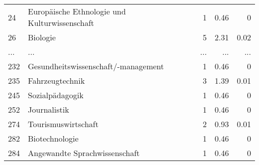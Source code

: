 \begin{longtable}{lXrrr}
        24 & \multicolumn{1}{X}{Europäische Ethnologie und Kulturwissenschaft} & %
          \num{1} &
          \num[round-mode=places,round-precision=2]{0.46} &
          \num[round-mode=places,round-precision=2]{0} \\
        26 & \multicolumn{1}{X}{Biologie} & %
          \num{5} &
          \num[round-mode=places,round-precision=2]{2.31} &
          \num[round-mode=places,round-precision=2]{0.02} \\
       ... & ... & ... & ... & ... \\
        232 & \multicolumn{1}{X}{Gesundheitswissenschaft/-management} & %
          \num{1} &
          \num[round-mode=places,round-precision=2]{0.46} &
          \num[round-mode=places,round-precision=2]{0} \\

        235 & \multicolumn{1}{X}{Fahrzeugtechnik} & %
          \num{3} &
          \num[round-mode=places,round-precision=2]{1.39} &
          \num[round-mode=places,round-precision=2]{0.01} \\

        245 & \multicolumn{1}{X}{Sozialpädagogik} & %
          \num{1} &
          \num[round-mode=places,round-precision=2]{0.46} &
          \num[round-mode=places,round-precision=2]{0} \\

        252 & \multicolumn{1}{X}{Journalistik} & %
          \num{1} &
          \num[round-mode=places,round-precision=2]{0.46} &
          \num[round-mode=places,round-precision=2]{0} \\

        274 & \multicolumn{1}{X}{Tourismuswirtschaft} & %
          \num{2} &
          \num[round-mode=places,round-precision=2]{0.93} &
          \num[round-mode=places,round-precision=2]{0.01} \\

        282 & \multicolumn{1}{X}{Biotechnologie} & %
          \num{1} &
          \num[round-mode=places,round-precision=2]{0.46} &
          \num[round-mode=places,round-precision=2]{0} \\

        284 & \multicolumn{1}{X}{Angewandte Sprachwissenschaft} & %
          \num{1} &
          \num[round-mode=places,round-precision=2]{0.46} &
          \num[round-mode=places,round-precision=2]{0} \\


\end{longtable}
